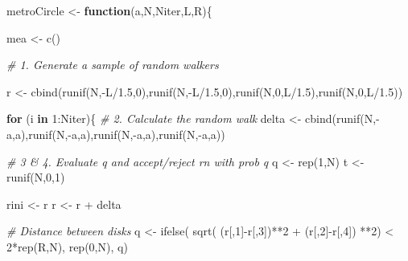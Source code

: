 \documentclass[11pt]{article}
\newenvironment{Shaded}{}{}
\newcommand{\DecValTok}[1]{\textcolor[rgb]{0.25,0.63,0.44}{{#1}}}
\newcommand{\FloatTok}[1]{\textcolor[rgb]{0.25,0.63,0.44}{{#1}}}
\newcommand{\CommentTok}[1]{\textcolor[rgb]{0.38,0.63,0.69}{\textit{{#1}}}}
\newcommand{\OtherTok}[1]{\textcolor[rgb]{0.00,0.44,0.13}{{#1}}}
\newcommand{\FunctionTok}[1]{\textcolor[rgb]{0.02,0.16,0.49}{{#1}}}
\newcommand{\NormalTok}[1]{{#1}}
\newcommand{\SpecialCharTok}[1]{\textcolor[rgb]{0.25,0.44,0.63}{{#1}}}
\newcommand{\ControlFlowTok}[1]{\textcolor[rgb]{0.00,0.44,0.13}{\textbf{{#1}}}}
\begin{document}
\begin{Shaded}
\begin{Highlighting}[]
\NormalTok{metroCircle }\OtherTok{\textless{}{-}} \ControlFlowTok{function}\NormalTok{(a,N,Niter,L,R)\{}
    
\NormalTok{    mea }\OtherTok{\textless{}{-}} \FunctionTok{c}\NormalTok{()}
    
    \CommentTok{\# 1. Generate a sample of random walkers}
    
\NormalTok{    r }\OtherTok{\textless{}{-}} \FunctionTok{cbind}\NormalTok{(}\FunctionTok{runif}\NormalTok{(N,}\SpecialCharTok{{-}}\NormalTok{L}\SpecialCharTok{/}\FloatTok{1.5}\NormalTok{,}\DecValTok{0}\NormalTok{),}\FunctionTok{runif}\NormalTok{(N,}\SpecialCharTok{{-}}\NormalTok{L}\SpecialCharTok{/}\FloatTok{1.5}\NormalTok{,}\DecValTok{0}\NormalTok{),}\FunctionTok{runif}\NormalTok{(N,}\DecValTok{0}\NormalTok{,L}\SpecialCharTok{/}\FloatTok{1.5}\NormalTok{),}\FunctionTok{runif}\NormalTok{(N,}\DecValTok{0}\NormalTok{,L}\SpecialCharTok{/}\FloatTok{1.5}\NormalTok{))}
    
    \ControlFlowTok{for}\NormalTok{ (i }\ControlFlowTok{in} \DecValTok{1}\SpecialCharTok{:}\NormalTok{Niter)\{}
        \CommentTok{\# 2. Calculate the random walk}
\NormalTok{        delta }\OtherTok{\textless{}{-}} \FunctionTok{cbind}\NormalTok{(}\FunctionTok{runif}\NormalTok{(N,}\SpecialCharTok{{-}}\NormalTok{a,a),}\FunctionTok{runif}\NormalTok{(N,}\SpecialCharTok{{-}}\NormalTok{a,a),}\FunctionTok{runif}\NormalTok{(N,}\SpecialCharTok{{-}}\NormalTok{a,a),}\FunctionTok{runif}\NormalTok{(N,}\SpecialCharTok{{-}}\NormalTok{a,a))}
        
        \CommentTok{\# 3 \& 4. Evaluate q and accept/reject rn with prob q}
\NormalTok{        q }\OtherTok{\textless{}{-}} \FunctionTok{rep}\NormalTok{(}\DecValTok{1}\NormalTok{,N)}
\NormalTok{        t }\OtherTok{\textless{}{-}} \FunctionTok{runif}\NormalTok{(N,}\DecValTok{0}\NormalTok{,}\DecValTok{1}\NormalTok{)}
        
\NormalTok{        rini }\OtherTok{\textless{}{-}}\NormalTok{ r}
\NormalTok{        r }\OtherTok{\textless{}{-}}\NormalTok{ r }\SpecialCharTok{+}\NormalTok{ delta}
        
        \CommentTok{\# Distance between disks}
\NormalTok{        q }\OtherTok{\textless{}{-}} \FunctionTok{ifelse}\NormalTok{( }\FunctionTok{sqrt}\NormalTok{( (r[,}\DecValTok{1}\NormalTok{]}\SpecialCharTok{{-}}\NormalTok{r[,}\DecValTok{3}\NormalTok{])}\SpecialCharTok{**}\DecValTok{2} \SpecialCharTok{+}\NormalTok{ (r[,}\DecValTok{2}\NormalTok{]}\SpecialCharTok{{-}}\NormalTok{r[,}\DecValTok{4}\NormalTok{]) }\SpecialCharTok{**}\DecValTok{2}\NormalTok{) }\SpecialCharTok{\textless{}} \DecValTok{2}\SpecialCharTok{*}\FunctionTok{rep}\NormalTok{(R,N), }\FunctionTok{rep}\NormalTok{(}\DecValTok{0}\NormalTok{,N), q)}
        

\end{Highlighting}
\end{Shaded}
\end{document}
